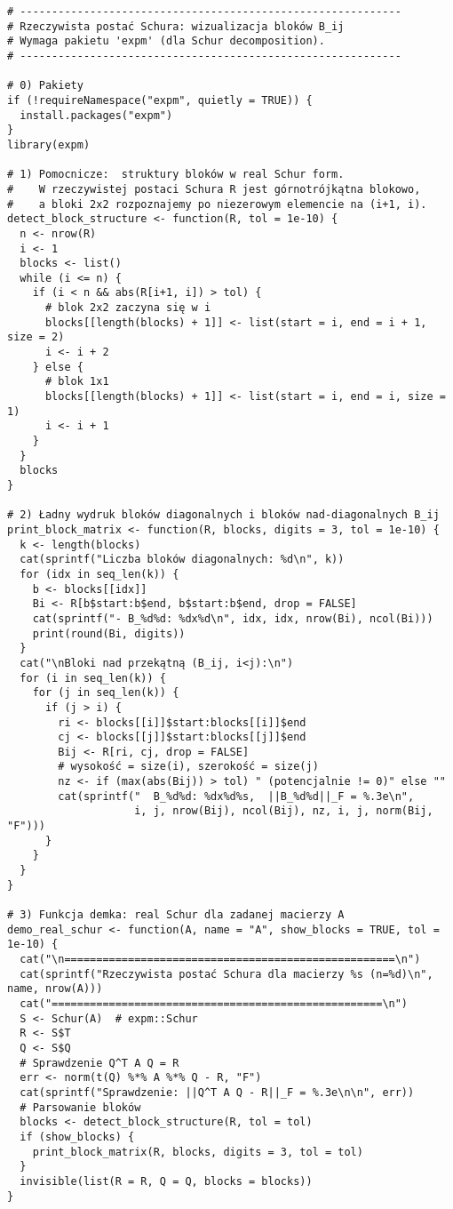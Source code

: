\documentclass[12pt]{article}
\theoremstyle{plain}
\theoremstyle{remark}
\begin{document}
\begin{verbatim}
# ------------------------------------------------------------
# Rzeczywista postać Schura: wizualizacja bloków B_ij
# Wymaga pakietu 'expm' (dla Schur decomposition).
# ------------------------------------------------------------

# 0) Pakiety
if (!requireNamespace("expm", quietly = TRUE)) {
  install.packages("expm")
}
library(expm)

# 1) Pomocnicze:  struktury bloków w real Schur form.
#    W rzeczywistej postaci Schura R jest górnotrójkątna blokowo,
#    a bloki 2x2 rozpoznajemy po niezerowym elemencie na (i+1, i).
detect_block_structure <- function(R, tol = 1e-10) {
  n <- nrow(R)
  i <- 1
  blocks <- list()
  while (i <= n) {
    if (i < n && abs(R[i+1, i]) > tol) {
      # blok 2x2 zaczyna się w i
      blocks[[length(blocks) + 1]] <- list(start = i, end = i + 1, size = 2)
      i <- i + 2
    } else {
      # blok 1x1
      blocks[[length(blocks) + 1]] <- list(start = i, end = i, size = 1)
      i <- i + 1
    }
  }
  blocks
}

# 2) Ładny wydruk bloków diagonalnych i bloków nad-diagonalnych B_ij
print_block_matrix <- function(R, blocks, digits = 3, tol = 1e-10) {
  k <- length(blocks)
  cat(sprintf("Liczba bloków diagonalnych: %d\n", k))
  for (idx in seq_len(k)) {
    b <- blocks[[idx]]
    Bi <- R[b$start:b$end, b$start:b$end, drop = FALSE]
    cat(sprintf("- B_%d%d: %dx%d\n", idx, idx, nrow(Bi), ncol(Bi)))
    print(round(Bi, digits))
  }
  cat("\nBloki nad przekątną (B_ij, i<j):\n")
  for (i in seq_len(k)) {
    for (j in seq_len(k)) {
      if (j > i) {
        ri <- blocks[[i]]$start:blocks[[i]]$end
        cj <- blocks[[j]]$start:blocks[[j]]$end
        Bij <- R[ri, cj, drop = FALSE]
        # wysokość = size(i), szerokość = size(j)
        nz <- if (max(abs(Bij)) > tol) " (potencjalnie != 0)" else ""
        cat(sprintf("  B_%d%d: %dx%d%s,  ||B_%d%d||_F = %.3e\n",
                    i, j, nrow(Bij), ncol(Bij), nz, i, j, norm(Bij, "F")))
      }
    }
  }
}

# 3) Funkcja demka: real Schur dla zadanej macierzy A
demo_real_schur <- function(A, name = "A", show_blocks = TRUE, tol = 1e-10) {
  cat("\n====================================================\n")
  cat(sprintf("Rzeczywista postać Schura dla macierzy %s (n=%d)\n", name, nrow(A)))
  cat("====================================================\n")
  S <- Schur(A)  # expm::Schur
  R <- S$T
  Q <- S$Q
  # Sprawdzenie Q^T A Q = R
  err <- norm(t(Q) %*% A %*% Q - R, "F")
  cat(sprintf("Sprawdzenie: ||Q^T A Q - R||_F = %.3e\n\n", err))
  # Parsowanie bloków
  blocks <- detect_block_structure(R, tol = tol)
  if (show_blocks) {
    print_block_matrix(R, blocks, digits = 3, tol = tol)
  }
  invisible(list(R = R, Q = Q, blocks = blocks))
}


\end{verbatim}
\end{document}
